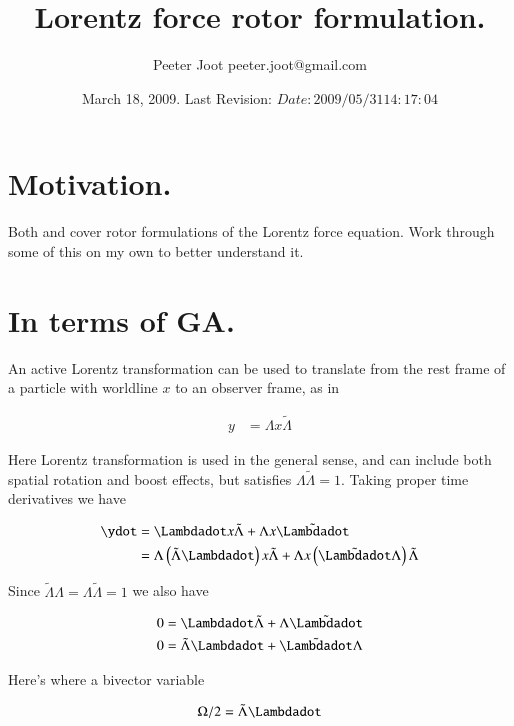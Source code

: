 \documentclass{article}
\title{ Lorentz force rotor formulation. }
\author{Peeter Joot \quad peeter.joot@gmail.com }
\date{ March 18, 2009.  Last Revision: $Date: 2009/05/31 14:17:04 $ }
\newcommand{\reverse}[1]{\tilde{{#1}}}
\begin{document}
\maketitle{}
\tableofcontents

\section{ Motivation. }

Both \cite{baylis-2007} and \cite{doran2003gap} cover rotor formulations
of the Lorentz force equation.  Work through some of this on my own to 
better understand it.

\section{ In terms of GA. }

An active Lorentz transformation can be used to translate from the rest frame of a particle with worldline $x$ to 
an observer frame, as in

\begin{align}\label{eqn:LorentzTx}
y &= \Lambda x \reverse{\Lambda}
\end{align}

Here Lorentz transformation is used in the general sense, and can include both spatial rotation and boost effects, but satisfies $\Lambda\reverse{\Lambda} = 1$.  Taking proper time derivatives we have

\begin{align*}
\ydot 
&= \Lambdadot x \reverse{\Lambda} + \Lambda x \reverse{\Lambdadot} \\
&= \Lambda \left(\reverse{\Lambda} \Lambdadot\right) x \reverse{\Lambda} + \Lambda x \left(\reverse{\Lambdadot} \Lambda \right) \reverse{\Lambda} \\
\end{align*}

Since $\reverse{\Lambda}\Lambda = \Lambda\reverse{\Lambda} = 1$ we also have

\begin{align*}
0 &= \Lambdadot\reverse{\Lambda} + \Lambda\reverse{\Lambdadot}  \\
0 &= \reverse{\Lambda}\Lambdadot + \reverse{\Lambdadot}\Lambda
\end{align*}

Here's where a bivector variable 

\begin{align}
\Omega/2 = \reverse{\Lambda} \Lambdadot
\end{align}
\end{document}
